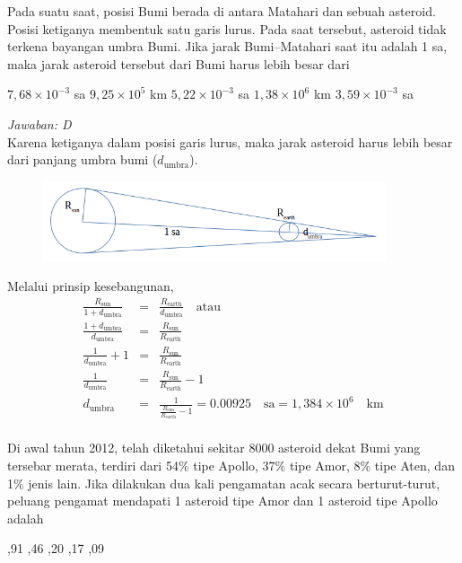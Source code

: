 \documentclass[11pt,fleqn]{exam}
\begin{document}
\begin{questions}
\question Pada suatu saat, posisi Bumi berada di antara Matahari dan sebuah asteroid. Posisi ketiganya membentuk satu garis lurus. Pada saat tersebut, asteroid tidak terkena bayangan umbra Bumi. Jika jarak Bumi\---Matahari saat itu adalah 1 sa, maka jarak asteroid tersebut dari Bumi harus lebih besar dari
\begin{choices}
\choice $7,68\times 10^{-3}$ sa
\choice $9,25\times 10^5$ km
\choice $5,22\times 10^{-3}$ sa
\choice $1,38\times 10^6$ km
\choice $3,59\times 10^{-3}$ sa
\end{choices}

\textit{Jawaban: D}\\

Karena ketiganya dalam posisi garis lurus, maka jarak asteroid harus lebih besar dari panjang umbra bumi ($d_{\text{umbra}}$).

\begin{figure}[!ht]
\centering
\includegraphics[width=0.9\textwidth]{osk_01.png}
\end{figure}

Melalui prinsip kesebangunan,
\begin{eqnarray*}
\frac{R_{\text{sun}}}{1 + d_{\text{umbra}}} &=& \frac{R_{\text{earth}}}{d_{\text{umbra}}} \quad \text{atau}\\
\frac{1 + d_{\text{umbra}}}{d_{\text{umbra}}} &=& \frac{R_{\text{sun}}}{R_{\text{earth}}}\\
\frac{1}{d_{\text{umbra}}} + 1 &=& \frac{R_{\text{sun}}}{R_{\text{earth}}}\\
\frac{1}{d_{\text{umbra}}} &=& \frac{R_{\text{sun}}}{R_{\text{earth}}} - 1 \\
d_{\text{umbra}} &=& \frac{1}{\frac{R_{\text{sun}}}{R_{\text{earth}}} - 1} = 0.00925 \quad \text{sa} = 1,384 \times 10^{6} \quad \text{km}\\
\end{eqnarray*}


\question Di awal tahun 2012, telah diketahui sekitar 8000 asteroid dekat Bumi yang tersebar merata, terdiri dari 54\% tipe Apollo, 37\% tipe Amor, 8\% tipe Aten, dan 1\% jenis lain. Jika dilakukan dua kali pengamatan acak secara berturut-turut, peluang pengamat mendapati 1 asteroid tipe Amor dan 1 asteroid tipe Apollo
adalah
\begin{choices}
,91
,46
,20
,17
,09
\end{choices}


\end{questions}
\end{document}
